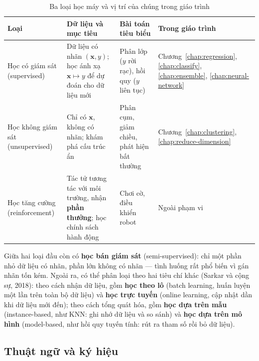 \begin{table}[H]
\centering
\begin{tabular}{|p{2.6cm}|p{4.4cm}|p{3.4cm}|p{2.9cm}|}
\hline
\textbf{Loại} & \textbf{Dữ liệu và mục tiêu} & \textbf{Bài toán tiêu biểu} & \textbf{Trong giáo trình} \\
\hline
Học có giám sát (supervised) & Dữ liệu có nhãn $(\mathbf{x}, y)$; học ánh xạ $\mathbf{x} \mapsto y$ để dự đoán cho dữ liệu mới & Phân lớp ($y$ rời rạc), hồi quy ($y$ liên tục) & Chương~\ref{chap:regression}, \ref{chap:classify}, \ref{chap:ensemble}, \ref{chap:neural-network} \\ \hline
Học không giám sát (unsupervised) & Chỉ có $\mathbf{x}$, không có nhãn; khám phá cấu trúc ẩn & Phân cụm, giảm chiều, phát hiện bất thường & Chương~\ref{chap:clustering}, \ref{chap:reduce-dimension} \\ \hline
Học tăng cường (reinforcement) & Tác tử tương tác với môi trường, nhận \textbf{phần thưởng}; học chính sách hành động & Chơi cờ, điều khiển robot & Ngoài phạm vi \\ \hline
\end{tabular}
\caption{Ba loại học máy và vị trí của chúng trong giáo trình}
\label{tab:ml-types}
\end{table}

Giữa hai loại đầu còn có \textbf{học bán giám sát} (semi-supervised): chỉ một phần nhỏ dữ liệu có nhãn, phần lớn không có nhãn --- tình huống rất phổ biến vì gán nhãn tốn kém. Ngoài ra, có thể phân loại theo hai tiêu chí khác (Sarkar và cộng sự, 2018): theo cách nhận dữ liệu, gồm \textbf{học theo lô} (batch learning, huấn luyện một lần trên toàn bộ dữ liệu) và \textbf{học trực tuyến} (online learning, cập nhật dần khi dữ liệu mới đến); theo cách tổng quát hóa, gồm \textbf{học dựa trên mẫu} (instance-based, như KNN: ghi nhớ dữ liệu và so sánh) và \textbf{học dựa trên mô hình} (model-based, như hồi quy tuyến tính: rút ra tham số rồi bỏ dữ liệu).

\subsection{Thuật ngữ và ký hiệu}

